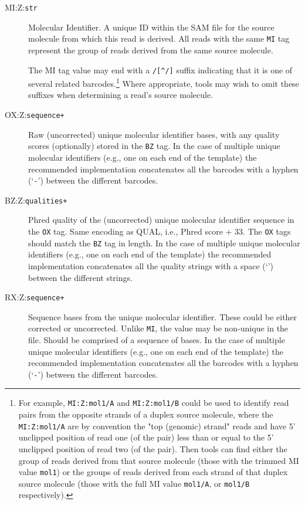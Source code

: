 \documentclass[10pt]{article}
\newcommand{\tagvalue}[1]{{\tt #1}}
\begin{document}
\begin{description}
\item[MI:Z:\tagvalue{str}]
Molecular Identifier. 
A unique ID within the SAM file for the source molecule from which this read is derived. 
All reads with the same {\tt MI} tag represent the group of reads derived from the same source molecule.

The MI tag value may end with a \verb"/[^/]" suffix indicating that it is one of several related barcodes.\footnote{For example, {\tt MI:Z:mol1/A} and {\tt MI:Z:mol1/B} could be used to identify read pairs from the opposite strands of a duplex source molecule, where the {\tt MI:Z:mol1/A} are by convention the "top (genomic) strand" reads and have 5' unclipped position of read one (of the pair) less than or equal to the 5' unclipped position of read two (of the pair).  Then tools can find either the group of reads derived from that source molecule (those with the trimmed MI value {\tt mol1}) or the groups of reads derived from each strand of that duplex source molecule (those with the full MI value {\tt mol1/A}, or {\tt mol1/B} respectively).}  Where appropriate, tools may wish to omit these suffixes when determining a read's source molecule.

\item[OX:Z:\tagvalue{sequence+}] 
Raw (uncorrected) unique molecular identifier bases, with any quality scores (optionally) stored in the {\tt BZ} tag. 
In the case of multiple unique molecular identifiers (e.g., one on each end of the template) the recommended implementation concatenates all the barcodes with a hyphen (`{\tt -}') between the different barcodes.

\item[BZ:Z:\tagvalue{qualities+}] 
Phred quality of the (uncorrected) unique molecular identifier sequence in the {\tt OX} tag.
Same encoding as {\sf QUAL}, i.e., Phred score + 33.
The {\tt OX} tags should match the {\tt BZ} tag in length. 
In the case of multiple unique molecular identifiers (e.g., one on each end of the template) the recommended implementation concatenates all the quality strings with a space (`{\tt \textvisiblespace}') between the different strings.

\item[RX:Z:\tagvalue{sequence+}]
Sequence bases from the unique molecular identifier.
These could be either corrected or uncorrected. Unlike {\tt MI}, the value may be non-unique in the file.
Should be comprised of a sequence of bases.
In the case of multiple unique molecular identifiers (e.g., one on each end of the template) the recommended implementation concatenates all the barcodes with a hyphen (`{\tt -}') between the different barcodes.


\end{description}
\end{document}
